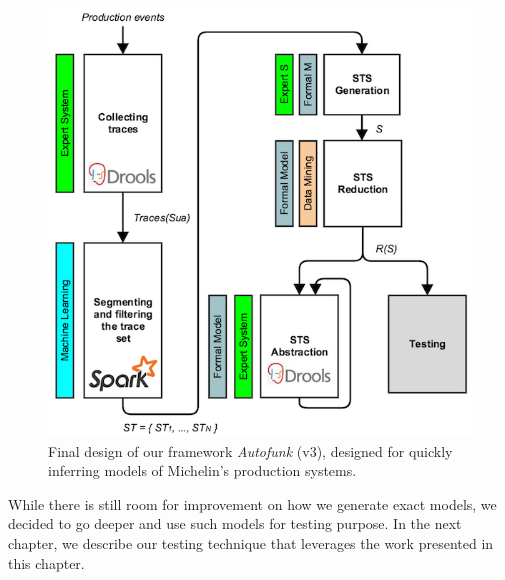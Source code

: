 \begin{figure}[h]
    \begin{center}
        \includegraphics[width=1.0\linewidth]{figures/autofunk_branded.png}
    \end{center}

    \caption{Final design of our framework \textit{Autofunk}
    (v3), designed for quickly inferring models of Michelin's
    production systems.}
    \label{fig:autofunk_branded}
\end{figure}

While there is still room for improvement on how we generate
exact models, we decided to go deeper and use such models for
testing purpose. In the next chapter, we describe our testing
technique that leverages the work presented in this chapter.
